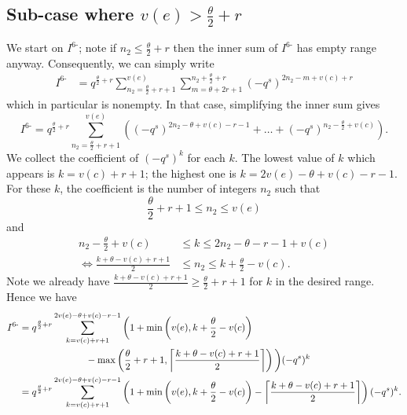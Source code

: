 \subsection{Sub-case where $v(e) > \frac{\theta}{2} + r$}
We start on $I^{\text{6-}}$; note if $n_2 \le \frac{\theta}{2} + r$
then the inner sum of $I^{\text{6-}}$ has empty range anyway.
Consequently, we can simply write
\begin{align*}
  I^{\text{6-}}
  &= q^{\frac{\theta}{2} + r} \sum_{n_2 = \frac{\theta}{2} + r + 1}^{v(e)}
  \sum_{m = \theta + 2r + 1}^{n_2 + \frac{\theta}{2} + r} (-q^s)^{2n_2 - m + v(c) + r}
\end{align*}
which in particular is nonempty.
In that case, simplifying the inner sum gives
\[
  I^{\text{6-}}
  = q^{\frac{\theta}{2} + r} \sum_{n_2 = \frac{\theta}{2} + r + 1}^{v(e)}
  \left(
    (-q^s)^{2n_2 - \theta + v(c) - r - 1}
    + \dots
    + (-q^s)^{n_2 - \frac{\theta}{2} + v(c)}
  \right).
\]
We collect the coefficient of $(-q^s)^k$ for each $k$.
The lowest value of $k$ which appears is $k = v(c) + r + 1$;
the highest one is $k = 2v(e) - \theta + v(c) - r - 1$.
For these $k$,
the coefficient is the number of integers $n_2$ such that
\[ \frac{\theta}{2} + r + 1 \le n_2 \le v(e) \]
and
\begin{align*}
  n_2 - \frac{\theta}{2} + v(c) &\le k \le 2n_2 - \theta - r - 1 + v(c) \\
  \iff \frac{k + \theta - v(c) + r + 1}{2} &\le n_2 \le k + \frac{\theta}{2} - v(c).
\end{align*}
Note we already have $\frac{k + \theta - v(c) + r + 1}{2} \ge \frac{\theta}{2}+r+1$
for $k$ in the desired range.
Hence we have
\begin{align*}
  I^{\text{6-}}
  &=
  q^{\frac{\theta}{2} + r}
  \sum_{k = v(c) + r + 1}^{2v(e) - \theta + v(c) - r - 1}
  \bigg( 1 + \min\left( v(e), k + \frac{\theta}{2} - v(c) \right) \\
    &\hspace{16ex} - \max\left( \frac{\theta}{2} + r + 1,
      \left\lceil \frac{k + \theta - v(c) + r + 1}{2} \right\rceil \right) \bigg) (-q^s)^k \\
  &=
  q^{\frac{\theta}{2} + r}
  \sum_{k = v(c) + r + 1}^{2v(e) - \theta + v(c) - r - 1}
  \left( 1 + \min\left( v(e), k + \frac{\theta}{2} - v(c) \right)
    - \left\lceil \frac{k + \theta - v(c) + r + 1}{2} \right\rceil
  \right) (-q^s)^k.
\end{align*}

